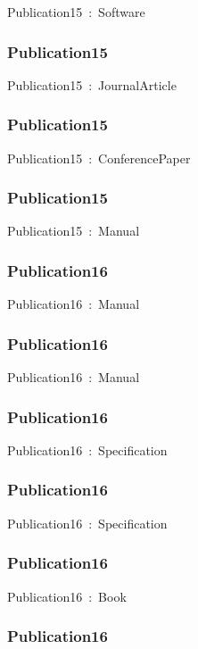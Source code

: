 \documentclass{article}
\begin{document}
Publication15~:~Software

\subsubsection*{Publication15}

Publication15~:~JournalArticle

\subsubsection*{Publication15}

Publication15~:~ConferencePaper

\subsubsection*{Publication15}

Publication15~:~Manual

\subsubsection*{Publication16}

Publication16~:~Manual

\subsubsection*{Publication16}

Publication16~:~Manual

\subsubsection*{Publication16}

Publication16~:~Specification

\subsubsection*{Publication16}

Publication16~:~Specification

\subsubsection*{Publication16}

Publication16~:~Book

\subsubsection*{Publication16}
\end{document}
